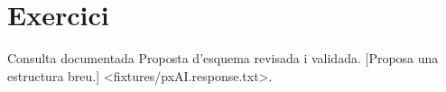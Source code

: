 \documentclass[
  CAT,ai-full,no-cover,no-toc,
  ai-config={statement={ClassStatement}}
]{P3CTeX}
\begin{document}
\section{Exercici}
Consulta documentada 
  {Proposta d'esquema revisada i validada.}
  [Proposa una estructura breu.]
  <fixtures/pxAI.response.txt>.
\cite{p3ctex-demo}
\end{document}
